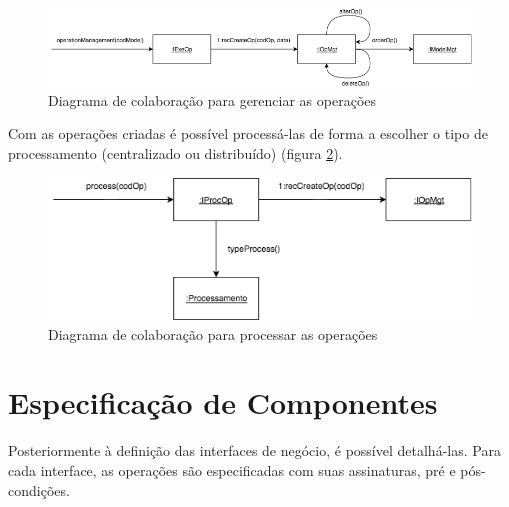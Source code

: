 \begin{figure}[h!]
	\centering
	\includegraphics[scale=0.5]{fig/operationManagement.png}
	\caption{Diagrama de colaboração para gerenciar as operações}
	\label{operationManagement}
\end{figure}

Com as operações criadas é possível processá-las de forma a escolher o tipo de processamento (centralizado ou distribuído) (figura \ref{process}).

\begin{figure}[h!]
	\centering
	\includegraphics[scale=0.5]{fig/process.png}
	\caption{Diagrama de colaboração para processar as operações}
	\label{process}
\end{figure}

\section{Especificação de Componentes}

Posteriormente à definição das interfaces de negócio, é possível detalhá-las. Para cada interface, as operações são especificadas com suas assinaturas, pré e pós-condições.


